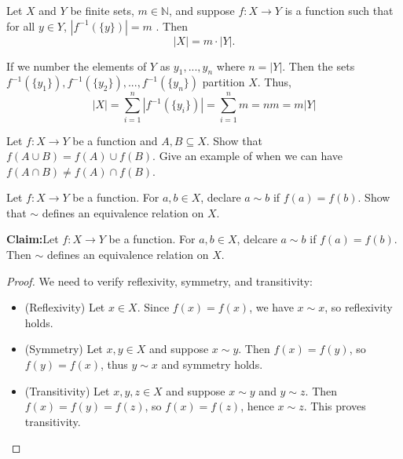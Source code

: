 \documentclass[11pt,dvipsnames]{book}
\numberwithin{equation}{section} %
\numberwithin{figure}{section} %
\numberwithin{table}{section} %
\begin{document}
\begin{exercise} Let $X$ and $Y$ be finite sets, $m\in \mathbb{N}$, and suppose $f:X\rightarrow Y$ is a function such that for all $y\in Y$, $|f^{-1}(\{y\})|=m$ . Then
\[
|X|=m\cdot |Y|.\]


\begin{solution}


If we number the elements of $Y$ as $y_{1},...,y_{n}$ where $n=|Y|$. Then the sets $f^{-1}(\{y_{1}\}),f^{-1}(\{y_{2}\}),...,f^{-1}(\{y_{n}\})$ partition $X$. Thus,
\[
|X|=\sum_{i=1}^{n}| f^{-1}(\{y_{i}\})| = \sum_{i=1}^{n}m=nm=m|Y|
\]
\end{solution}


\end{exercise}



\begin{exercise}
Let $f:X\rightarrow Y$ be a function and $A,B\subseteq X$. Show that $f(A\cup B)=f(A)\cup f(B)$. Give an example of when we can have $f(A\cap B)\neq f(A)\cap f(B)$. 
\end{exercise}





\begin{exercise} Let $f:X\rightarrow Y$ be a function. For $a,b\in X$, declare $a\sim b$ if $f(a)=f(b)$. 
Show that $\sim$ defines an equivalence relation on $X$. 


\begin{solution}
{\bf Claim:}Let $f:X\rightarrow Y$ be a function. For $a,b\in X$, delcare $a\sim b$ if $f(a)=f(b)$. Then $\sim$ defines an equivalence relation on $X$. 


\begin{proof}
We need to verify reflexivity, symmetry, and transitivity:
\begin{itemize}
\item (Reflexivity) Let $x\in X$. Since $f(x)=f(x)$, we have $x\sim x$, so reflexivity holds.
\item (Symmetry) Let $x,y\in X$ and suppose $x\sim y$. Then $f(x)=f(y)$, so $f(y)=f(x)$, thus $y\sim x$ and symmetry holds. 
\item (Transitivity)  Let $x,y,z\in X$ and suppose $x\sim y$ and $y\sim z$. Then $f(x)=f(y)=f(z)$, so $f(x)=f(z)$, hence $x\sim z$. This proves transitivity. 
\end{itemize}
\end{proof}
\end{solution}



\end{exercise}
\end{document}
